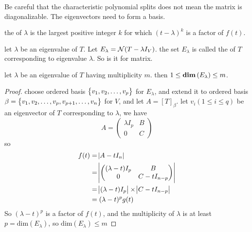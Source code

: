 Be careful that the characteristic polynomial splits does not mean the matrix is diagonalizable. The eigenvectors need to form a basis.

\begin{definition}
    the  of $\lambda$ is the largest positive integer $k$ for which $(t - \lambda)^k$ is a factor of $f(t)$.
\end{definition}

\begin{definition}
    let $\lambda$ be an eigenvalue of $T$. Let $E_\lambda = \mathcal{N}(T - \lambda I_V)$. the set $E_\lambda$ is called the  of $T$ corresponding to eigenvalue $\lambda$. So is it for matrix.
\end{definition}

\begin{theorem}
    let $\lambda$ be an eigenvalue of $T$ having multiplicity $m$. then $1 \leq \displaystyle \mathbf{dim}\left( E_\lambda \right) \leq m$.
\end{theorem}
\begin{proof}
    choose ordered basis $\set{v_1, v_2, \dots, v_p}$ for $E_\lambda$, and extend it to ordered basis $\beta =\set{v_1, v_2, \dots, v_p, v_{p+1}, \dots, v_n}$ for $V$, and let $A = [T]_\beta$. let $v_i (1 \leq i \leq q)$ be an eigenvector of $T$ corresponding to $\lambda$, we have
    \begin{equation*}
        A = \begin{pmatrix}
            \lambda I_p & B \\
            0 & C
        \end{pmatrix}
    \end{equation*}
    so \begin{equation*}
        \begin{aligned}
            f(t) &= \abs{A - t I_n} \\
            &= \abs{\begin{pmatrix}
                (\lambda - t) I_p & B \\
                0 & C - t I_{n-p}
            \end{pmatrix}} \\
            &= \abs{(\lambda - t)I_p} \times \abs{C - t I_{n-p}} \\
            &= (\lambda - t)^p g(t)
        \end{aligned}
        \end{equation*}
    So $(\lambda - t)^p$ is a factor of $f(t)$, and the multiplicity of $\lambda$ is at least $p = \text{dim}(E_\lambda)$, so $\text{dim}(E_\lambda) \leq m$ 
\end{proof}

